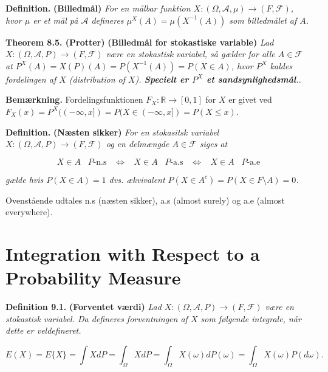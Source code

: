 \documentclass[a4paper,10pt,openany]{book}
\begin{document}
\textbf{Definition.} \textbf{(Billedmål)} \emph{For en målbar funktion \(X : (\Omega,\mathcal{A},\mu) \to (F,\mathcal{F})\), hvor \(\mu\) er et mål på \(\mathcal{A}\) defineres \(\mu^X(A)=\mu(X^{-1}(A))\) som billedmålet af \(A\).}

\textbf{Theorem 8.5. (Protter)} \textbf{(Billedmål for stokastiske variable)} \emph{Lad \(X : (\Omega,\mathcal{A},P) \to (F,\mathcal{F})\) være en stokastisk variabel, så gælder for alle \(A\in\mathcal{F}\) at \(P^X(A)=X(P)(A)=P(X^{-1}(A))=P(X\in A)\), hvor \(P^X\) kaldes fordelingen af \(X\) (distribution of \(X\)). \textbf{Specielt er \(P^X\) et sandsynlighedsmål}..}

\textbf{Bemærkning.} Fordelingsfunktionen \(F_X: \mathbb{R}\to [0,1]\) for \(X\) er givet ved \(F_X(x)=P^X((-\infty,x])=P(X\in (-\infty,x])=P(X\le x)\).

\textbf{Definition.} \textbf{(Næsten sikker)} \emph{For en stokasitsk variabel \(X:(\Omega,\mathcal{A},P) \to (F,\mathcal{F})\) og en delmængde \(A\in \mathcal{F}\) siges at}

\[
X\in A\hspace{10pt} P\text{-n.s}\hspace{10pt}\Leftrightarrow\hspace{10pt} X\in A\hspace{10pt} P\text{-a.s}\hspace{10pt}\Leftrightarrow\hspace{10pt} X\in A\hspace{10pt} P\text{-a.e}
\]

\emph{gælde hvis \(P(X\in A)=1\) dvs. ækvivalent \(P(X\in A^c)=P(X\in F\setminus A)=0\).}

Ovenstående udtales n.s (næsten sikker), a.s (almost surely) og a.e (almost everywhere).

\hypertarget{integration-with-respect-to-a-probability-measure}{%
\section{Integration with Respect to a Probability Measure}\label{integration-with-respect-to-a-probability-measure}}

\textbf{Definition 9.1.} \textbf{(Forventet værdi)} \emph{Lad \(X : (\Omega, \mathcal{A}, P) \to (F,\mathcal{F})\) være en stokastisk variabel. Da defineres forventningen af \(X\) som følgende integrale, når dette er veldefineret.}

\[
E(X)=E\{X\}=\int X dP=\int_\Omega X dP=\int_\Omega X(\omega)dP(\omega)=\int_\Omega X(\omega)P(d\omega).
\]
\end{document}
